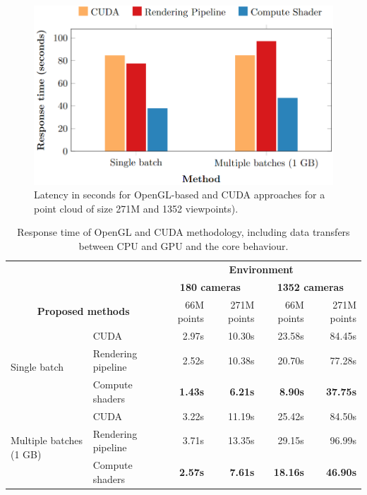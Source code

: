 \begin{figure}[htb]
    \includegraphics[width=\linewidth]{figs/multi_thermal_projection/results/response_time_cuda_opengl.png}
    \caption{Latency in seconds for OpenGL-based and CUDA approaches for a point cloud of size 271M and 1352 viewpoints).}
    \label{fig:cuda_opengl_occlusion_response_time}
\end{figure}

\renewcommand{\arraystretch}{1.2}
\begin{table}[hb]
\centering
\caption{Response time of OpenGL and CUDA methodology, including data transfers between CPU and GPU and the core behaviour.}
\label{table:cuda_opengl_occlusion_response_time}
\begin{tabular}{llrrrr}
    \toprule
    \multicolumn{2}{c}{} & \multicolumn{4}{c}{\textbf{Environment}} \\
    \cmidrule{3-6}
    \multicolumn{2}{c}{} & \multicolumn{2}{c}{\textbf{180 cameras}} & \multicolumn{2}{c}{\textbf{1352 cameras}}\\
    \cmidrule{3-6}
    \multicolumn{2}{c}{\textbf{Proposed methods}} & 66M points & 271M points & 66M points & 271M points\\
    \midrule
    \multirow{3}{*}{Single batch} & CUDA & 2.97s & 10.30s & 23.58s & 84.45s\\
    & Rendering pipeline & 2.52s & 10.38s & 20.70s & 77.28s\\
    & Compute shaders & \textbf{1.43s} & \textbf{6.21s} & \textbf{8.90s} & \textbf{37.75s}\\
    \hline
    \multirow{3}{*}{Multiple batches (1 GB)} & CUDA & 3.22s & 11.19s & 25.42s & 84.50s\\
    & Rendering pipeline & 3.71s & 13.35s & 29.15s & 96.99s\\
    & Compute shaders & \textbf{2.57s} & \textbf{7.61s} & \textbf{18.16s} & \textbf{46.90s}\\
    \bottomrule
\end{tabular}
\end{table}
\renewcommand{\arraystretch}{1}

